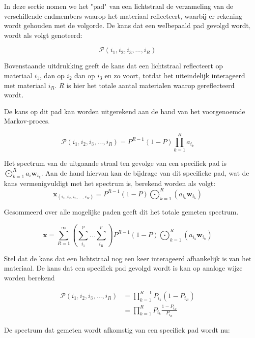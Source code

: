 \documentclass[12pt]{report}
\DeclareMathOperator*{\Odot}{\bigodot}
\begin{document}
In deze sectie nomen we het "pad" van een lichtstraal de verzameling van de verschillende endmembers waarop het materiaal reflecteert, waarbij er rekening wordt gehouden met de volgorde. De kans dat een welbepaald pad gevolgd wordt, wordt als volgt genoteerd:

\begin{equation}
\mathcal{P}(i_1,i_2,i_3,...,i_R)
\end{equation}

Bovenstaande uitdrukking geeft de kans dat een lichtstraal reflecteert op materiaal 
$i_1$, dan op $i_2$ dan op $i_3$ en zo voort, totdat het uiteindelijk interageerd met materiaal $i_R$. $R$ is hier het totale aantal materialen waarop gereflecteerd wordt.

De kans op dit pad kan worden uitgerekend aan de hand van het voorgenoemde Markov-proces\cite{mlinmix}. 

\begin{equation}
\mathcal{P}(i_1,i_2,i_3,...,i_R) = P^{R-1} (1-P) \prod_{k=1}^R a_{i_k}
\end{equation}

Het spectrum van de uitgaande straal ten gevolge van een specifiek pad is $\Odot_{k=1}^R a_i \bm{w}_{i_k}$. Aan de hand hiervan kan de bijdrage van dit specifieke pad, wat de kans vermenigvuldigt met het spectrum is, berekend worden als volgt:
\begin{equation}
\bm{x}_{(i_1,i_2,i_3,...,i_R)} = P^{R-1} (1-P) \Odot_{k=1}^R \left(a_{i_k} \bm{w}_{i_k}\right)
\end{equation}

Gesommeerd over alle mogelijke paden geeft dit het totale gemeten spectrum. 

\begin{equation}
\bm{x} = \sum_{R=1}^{\infty} \left(\sum_{i_1}^{p} ... \sum_{i_R}^{p}\right)P^{R-1} (1-P) \Odot_{k=1}^R \left(a_{i_k} \bm{w}_{i_k}\right)
\end{equation}

Stel dat de kans dat een lichtstraal nog een keer interageerd afhankelijk is van het materiaal. De kans dat een specifiek pad gevolgd wordt is kan op analoge wijze worden berekend

\begin{align}
\mathcal{P}(i_1,i_2,i_3,...,i_R) &= \prod_{k=1}^{R-1}P_{i_k} (1-P_{i_R})\\
&= \prod_{k=1}^{R}P_{i_k} \frac{1-P_{i_R}}{P_{i_R}}
\end{align}

De spectrum dat gemeten wordt afkomstig van een specifiek pad wordt nu:
\end{document}
